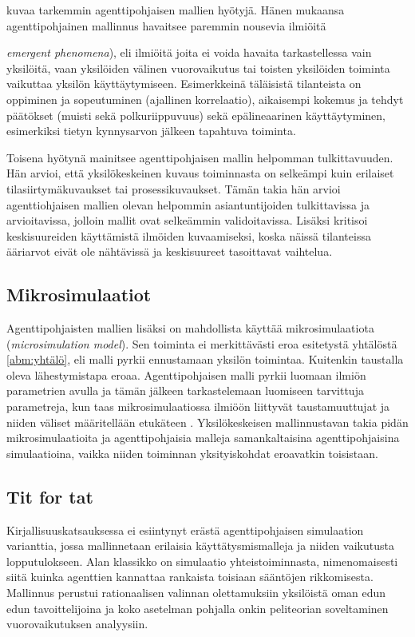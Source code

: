 \documentclass[finnish,gradu,twoside,12pt]{tktltiki}
\begin{document}
\citet{Bonabeau2002} kuvaa tarkemmin agenttipohjaisen mallien hyötyjä. Hänen mukaansa agenttipohjainen mallinnus havaitsee paremmin nousevia ilmiöitä {\textit{emergent phenomena}), eli ilmiöitä joita ei voida havaita tarkastellessa vain yksilöitä, vaan yksilöiden välinen vuorovaikutus tai toisten yksilöiden toiminta vaikuttaa yksilön käyttäytymiseen. Esimerkkeinä täläisistä tilanteista on oppiminen ja sopeutuminen (ajallinen korrelaatio), aikaisempi kokemus ja tehdyt päätökset (muisti sekä polkuriippuvuus) sekä epälineaarinen käyttäytyminen, esimerkiksi tietyn kynnysarvon jälkeen tapahtuva toiminta.

Toisena hyötynä \citet{Bonabeau2002} mainitsee agenttipohjaisen mallin helpomman tulkittavuuden. Hän arvioi, että yksilökeskeinen kuvaus toiminnasta on selkeämpi kuin erilaiset tilasiirtymäkuvaukset tai prosessikuvaukset. Tämän takia hän arvioi agenttiohjaisen mallien olevan helpommin asiantuntijoiden tulkittavissa ja arvioitavissa, jolloin mallit ovat selkeämmin validoitavissa. Lisäksi \citet{Bonabeau2002} kritisoi keskisuureiden käyttämistä ilmöiden kuvaamiseksi, koska näissä tilanteissa ääriarvot eivät ole nähtävissä ja keskisuureet tasoittavat vaihtelua.

\subsection*{Mikrosimulaatiot}

Agenttipohjaisten mallien lisäksi on mahdollista käyttää mikrosimulaatiota  (\textit{microsimulation model}). Sen toiminta ei merkittävästi eroa esitetystä yhtälöstä \ref{abm:yhtälö}, eli malli pyrkii ennustamaan yksilön toimintaa. Kuitenkin taustalla oleva lähestymistapa eroaa. Agenttipohjaisen malli pyrkii luomaan ilmiön parametrien avulla ja tämän jälkeen tarkastelemaan luomiseen tarvittuja parametreja, kun taas mikrosimulaatiossa ilmiöön liittyvät taustamuuttujat ja niiden väliset määritellään etukäteen \citep[58--59]{Gilbert2005}. Yksilökeskeisen mallinnustavan takia pidän mikrosimulaatioita ja agenttipohjaisia malleja samankaltaisina agenttipohjaisina simulaatioina, vaikka niiden toiminnan yksityiskohdat eroavatkin toisistaan.

\subsection*{Tit for tat}

Kirjallisuuskatsauksessa ei esiintynyt erästä agenttipohjaisen simulaation varianttia, jossa mallinnetaan erilaisia käyttätysmismalleja ja niiden vaikutusta lopputulokseen. Alan klassikko on \citet{Axelrod01031980} simulaatio yhteistoiminnasta, nimenomaisesti siitä kuinka agenttien kannattaa rankaista toisiaan sääntöjen rikkomisesta. Mallinnus perustui rationaalisen valinnan olettamuksiin yksilöistä oman edun edun tavoittelijoina ja koko asetelman pohjalla onkin peliteorian soveltaminen vuorovaikutuksen analyysiin.

}
\end{document}

